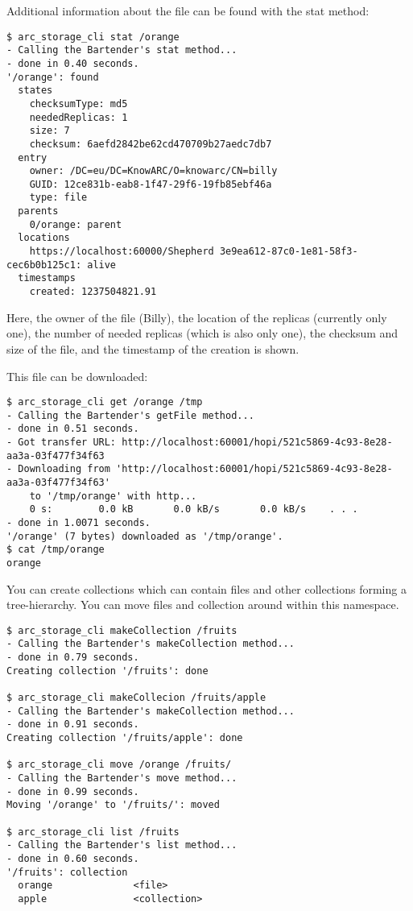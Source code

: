 \documentclass{article}
\begin{document}
Additional information about the file can be found with the stat method:

\begin{verbatim}
$ arc_storage_cli stat /orange
- Calling the Bartender's stat method...
- done in 0.40 seconds.
'/orange': found
  states
    checksumType: md5
    neededReplicas: 1
    size: 7
    checksum: 6aefd2842be62cd470709b27aedc7db7
  entry
    owner: /DC=eu/DC=KnowARC/O=knowarc/CN=billy
    GUID: 12ce831b-eab8-1f47-29f6-19fb85ebf46a
    type: file
  parents
    0/orange: parent
  locations
    https://localhost:60000/Shepherd 3e9ea612-87c0-1e81-58f3-cec6b0b125c1: alive
  timestamps
    created: 1237504821.91
\end{verbatim}

Here, the owner of the file (Billy), the location of the replicas (currently only one), the number of needed replicas (which is also only one), the checksum and size of the file, and the timestamp of the creation is shown.

This file can be downloaded:

\begin{verbatim}
$ arc_storage_cli get /orange /tmp
- Calling the Bartender's getFile method...
- done in 0.51 seconds.
- Got transfer URL: http://localhost:60001/hopi/521c5869-4c93-8e28-aa3a-03f477f34f63
- Downloading from 'http://localhost:60001/hopi/521c5869-4c93-8e28-aa3a-03f477f34f63'
    to '/tmp/orange' with http...
    0 s:        0.0 kB       0.0 kB/s       0.0 kB/s    . . .       
- done in 1.0071 seconds.
'/orange' (7 bytes) downloaded as '/tmp/orange'.
$ cat /tmp/orange 
orange
\end{verbatim}

You can create collections which can contain files and other collections forming a tree-hierarchy. You can move files and collection around within this namespace.

\begin{verbatim}
$ arc_storage_cli makeCollection /fruits
- Calling the Bartender's makeCollection method...
- done in 0.79 seconds.
Creating collection '/fruits': done

$ arc_storage_cli makeCollecion /fruits/apple
- Calling the Bartender's makeCollection method...
- done in 0.91 seconds.
Creating collection '/fruits/apple': done

$ arc_storage_cli move /orange /fruits/
- Calling the Bartender's move method...
- done in 0.99 seconds.
Moving '/orange' to '/fruits/': moved

$ arc_storage_cli list /fruits
- Calling the Bartender's list method...
- done in 0.60 seconds.
'/fruits': collection
  orange              <file>
  apple               <collection>
\end{verbatim}
\end{document}
